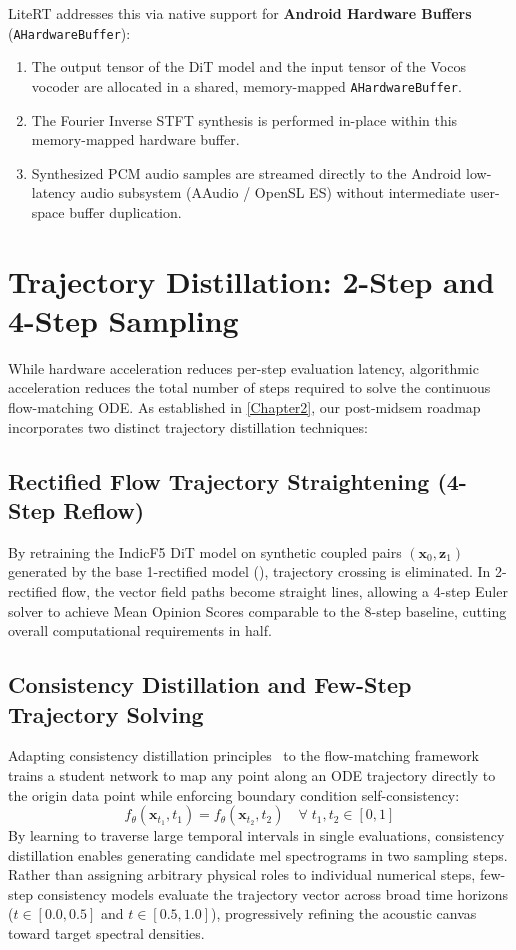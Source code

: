 LiteRT addresses this via native support for \textbf{Android Hardware Buffers} (\texttt{AHardwareBuffer}):
\begin{enumerate}
    \item The output tensor of the DiT model and the input tensor of the Vocos vocoder are allocated in a shared, memory-mapped \texttt{AHardwareBuffer}.
    \item The Fourier Inverse STFT synthesis is performed in-place within this memory-mapped hardware buffer.
    \item Synthesized PCM audio samples are streamed directly to the Android low-latency audio subsystem (AAudio / OpenSL ES) without intermediate user-space buffer duplication.
\end{enumerate}

\section{Trajectory Distillation: 2-Step and 4-Step Sampling}
While hardware acceleration reduces per-step evaluation latency, algorithmic acceleration reduces the total number of steps required to solve the continuous flow-matching ODE. As established in \cref{Chapter2}, our post-midsem roadmap incorporates two distinct trajectory distillation techniques:

\subsection{Rectified Flow Trajectory Straightening (4-Step Reflow)}
By retraining the IndicF5 DiT model on synthetic coupled pairs $(\mathbf{x}_0, \mathbf{z}_1)$ generated by the base 1-rectified model (), trajectory crossing is eliminated. In 2-rectified flow, the vector field paths become straight lines, allowing a 4-step Euler solver to achieve Mean Opinion Scores comparable to the 8-step baseline, cutting overall computational requirements in half.

\subsection{Consistency Distillation and Few-Step Trajectory Solving}
Adapting consistency distillation principles~\cite{flashspeech2024} to the flow-matching framework trains a student network to map any point along an ODE trajectory directly to the origin data point while enforcing boundary condition self-consistency:
\begin{equation}
    f_\theta(\mathbf{x}_{t_1}, t_1) = f_\theta(\mathbf{x}_{t_2}, t_2) \quad \forall \; t_1, t_2 \in [0, 1]
\end{equation}
By learning to traverse large temporal intervals in single evaluations, consistency distillation enables generating candidate mel spectrograms in two sampling steps. Rather than assigning arbitrary physical roles to individual numerical steps, few-step consistency models evaluate the trajectory vector across broad time horizons ($t \in [0.0, 0.5]$ and $t \in [0.5, 1.0]$), progressively refining the acoustic canvas toward target spectral densities.

